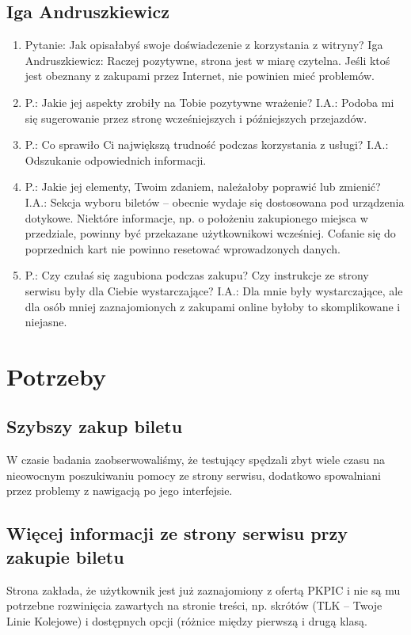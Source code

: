 \documentclass{article}
\begin{document}
\subsection{Iga Andruszkiewicz}
\begin{enumerate}
\item Pytanie: Jak opisałabyś swoje doświadczenie z korzystania z witryny? \newline
Iga Andruszkiewicz: Raczej pozytywne, strona jest w miarę czytelna. Jeśli ktoś jest obeznany z zakupami przez Internet,
nie powinien mieć problemów.
\item P.: Jakie jej aspekty zrobiły na Tobie pozytywne wrażenie? \newline
I.A.: Podoba mi się sugerowanie przez stronę wcześniejszych i późniejszych przejazdów.
\item P.: Co sprawiło Ci największą trudność podczas korzystania z usługi? \newline
I.A.: Odszukanie odpowiednich informacji.
\item P.: Jakie jej elementy, Twoim zdaniem, należałoby poprawić lub zmienić? \newline
I.A.: Sekcja wyboru biletów -- obecnie wydaje się dostosowana pod urządzenia dotykowe.
Niektóre informacje, np. o położeniu zakupionego miejsca w przedziale, powinny być przekazane użytkownikowi wcześniej.
Cofanie się do poprzednich kart nie powinno resetować wprowadzonych danych.
\item P.: Czy czułaś się zagubiona podczas zakupu? Czy instrukcje ze strony serwisu były dla Ciebie wystarczające? \newline
I.A.: Dla mnie były wystarczające, ale dla osób mniej zaznajomionych z zakupami online byłoby to skomplikowane i niejasne.
\end{enumerate}

\section{Potrzeby}
\label{6.}
\subsection{Szybszy zakup biletu}
W czasie badania zaobserwowaliśmy, że testujący spędzali zbyt wiele czasu na nieowocnym poszukiwaniu pomocy ze strony serwisu, dodatkowo spowalniani przez problemy z nawigacją po jego interfejsie.
\subsection{Więcej informacji ze strony serwisu przy zakupie biletu}
Strona zakłada, że użytkownik jest już zaznajomiony z ofertą PKPIC i nie są mu potrzebne rozwinięcia zawartych na stronie treści, np. skrótów (TLK -- Twoje Linie Kolejowe) i dostępnych opcji (różnice między pierwszą i drugą klasą.
\end{document}

